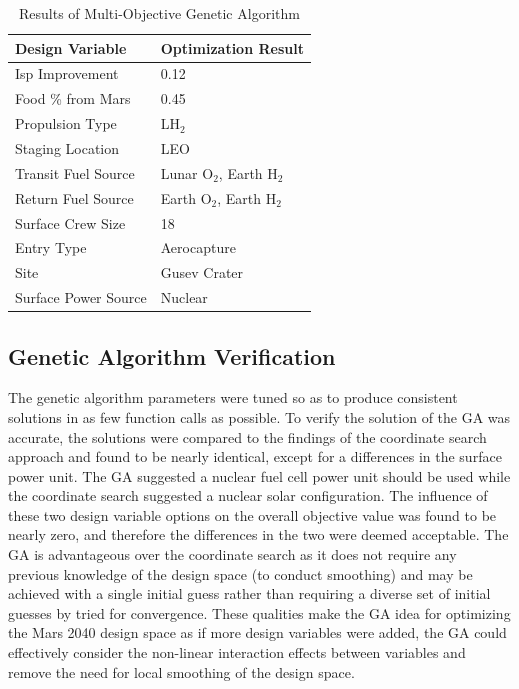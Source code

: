\documentclass[]{aiaa-pretty}
\begin{document}
\begin{table}[h!]
	\centering
	\caption{Results of Multi-Objective Genetic Algorithm}
	\label{tab:GAmulti}
	\begin{tabular}{ll}
	\textbf{Design Variable} & \textbf{Optimization Result}\\ \hline
	Isp Improvement & 0.12 \\
	Food \% from Mars & 0.45 \\
	Propulsion Type & LH$_2$ \\
	Staging Location & LEO \\
	Transit Fuel Source & Lunar O$_2$, Earth H$_2$ \\
	Return Fuel Source & Earth O$_2$, Earth H$_2$ \\
	Surface Crew Size & 18\\
	Entry Type & Aerocapture \\
	Site & Gusev Crater \\
	Surface Power Source & Nuclear\\
	\end{tabular}
\end{table}

\subsection{Genetic Algorithm Verification}
The genetic algorithm parameters were tuned so as to produce consistent solutions in as few function calls as possible. To verify the solution of the GA was accurate, the solutions were compared to the findings of the coordinate search approach and found to be nearly identical, except for a differences in the surface power unit. The GA suggested a nuclear fuel cell power unit should be used while the coordinate search suggested a nuclear solar configuration. The influence of these two design variable options on the overall objective value was found to be nearly zero, and therefore the differences in the two were deemed acceptable. The GA is advantageous over the coordinate search as it does not require any previous knowledge of the design space (to conduct smoothing) and may be achieved with a single initial guess rather than requiring a diverse set of initial guesses by tried for convergence. These qualities make the GA idea for optimizing the Mars 2040 design space as if more design variables were added, the GA could effectively consider the non-linear interaction effects between variables and remove the need for local smoothing of the design space.
\end{document}

